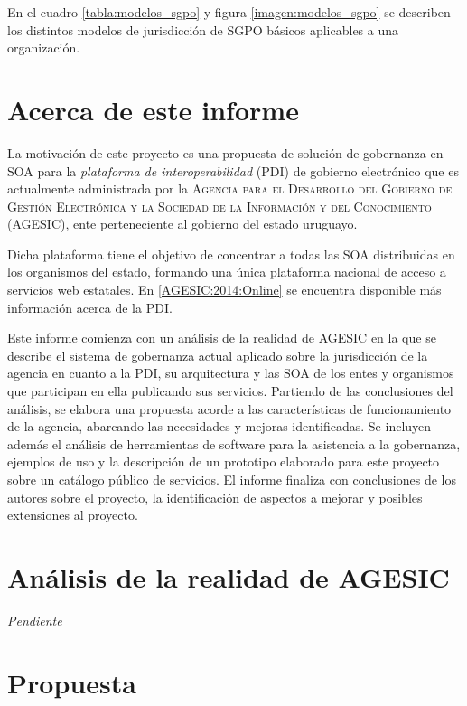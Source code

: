 \documentclass[11pt]{article}
\begin{document}
			En el cuadro \ref{tabla:modelos_sgpo} y figura \ref{imagen:modelos_sgpo} se describen los distintos modelos de jurisdicción de SGPO básicos aplicables a una organización.

		\section{Acerca de este informe}
			La motivación de este proyecto es una propuesta de solución de gobernanza en SOA para la \emph{plataforma de interoperabilidad} (PDI) de gobierno electrónico que es actualmente administrada por la \textsc{Agencia para el Desarrollo del Gobierno de Gestión Electrónica y la Sociedad de la Información y del Conocimiento (AGESIC)}, ente perteneciente al gobierno del estado uruguayo.

			Dicha plataforma tiene el objetivo de concentrar a todas las SOA distribuidas en los organismos del estado, formando una única plataforma nacional de acceso a servicios web estatales. En \ref{AGESIC:2014:Online} se encuentra disponible más información acerca de la PDI.

			Este informe comienza con un análisis de la realidad de AGESIC en la que se describe el sistema de gobernanza actual aplicado sobre la jurisdicción de la agencia en cuanto a la PDI, su arquitectura y las SOA de los entes y organismos que participan en ella publicando sus servicios. Partiendo de las conclusiones del análisis, se elabora una propuesta acorde a las características de funcionamiento de la agencia, abarcando las necesidades y mejoras identificadas.
			Se incluyen además el análisis de herramientas de software para la asistencia a la gobernanza, ejemplos de uso y la descripción de un prototipo elaborado para este proyecto sobre un catálogo público de servicios.
			El informe finaliza con conclusiones de los autores sobre el proyecto, la identificación de aspectos a mejorar y posibles extensiones al proyecto.

	\section{Análisis de la realidad de AGESIC}
		\emph{Pendiente} %

	\section{Propuesta}
\end{document}
